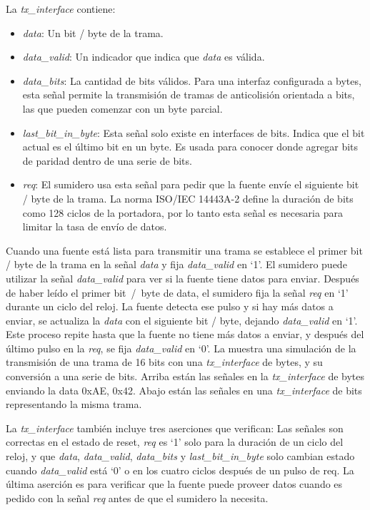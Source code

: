 \documentclass[a4paper, twoside, 11pt]{report}
\begin{document}
\FloatBarrier

La \textit{tx\_interface} contiene:

\begin{itemize}
  \item \textit{data}: Un bit / byte de la trama.
  \item \textit{data\_valid}: Un indicador que indica que \textit{data} es válida.
  \item \textit{data\_bits}: La cantidad de bits válidos. Para una interfaz configurada a bytes, esta señal permite la transmisión de tramas de anticolisión orientada a bits, las que pueden comenzar con un byte parcial.
  \item \textit{last\_bit\_in\_byte}: Esta señal solo existe en interfaces de bits. Indica que el bit actual es el último bit en un byte. Es usada para conocer donde agregar bits de paridad dentro de una serie de bits.
  \item \textit{req}: El sumidero usa esta señal para pedir que la fuente envíe el siguiente bit / byte de la trama. La norma ISO/IEC 14443A-2 define la duración de bits como 128 ciclos de la portadora, por lo tanto esta señal es necesaria para limitar la tasa de envío de datos.
\end{itemize}

Cuando una fuente está lista para transmitir una trama se establece el primer bit / byte de la trama en la señal \textit{data} y fija \textit{data\_valid} en ‘1’. El sumidero puede utilizar la señal \textit{data\_valid} para ver si la fuente tiene datos para enviar. Después de haber leído el primer bit~/~byte de data, el sumidero fija la señal \textit{req} en ‘1’ durante un ciclo del reloj. La fuente detecta ese pulso y si hay más datos a enviar, se actualiza la \textit{data} con el siguiente bit / byte, dejando \textit{data\_valid} en ‘1’. Este proceso repite hasta que la fuente no tiene más datos a enviar, y después del último pulso en la \textit{req}, se fija \textit{data\_valid} en ‘0’. La  muestra una simulación de la transmisión de una trama de 16 bits con una \textit{tx\_interface} de bytes, y su conversión a una serie de bits. Arriba están las señales en la \textit{tx\_interface} de bytes enviando la data 0xAE, 0x42. Abajo están las señales en una \textit{tx\_interface} de bits representando la misma trama.

La \textit{tx\_interface} también incluye tres aserciones que verifican: Las señales son correctas en el estado de reset, \textit{req} es ‘1’ solo para la duración de un ciclo del reloj, y que \textit{data}, \textit{data\_valid}, \textit{data\_bits} y \textit{last\_bit\_in\_byte} solo cambian estado cuando \textit{data\_valid} está ‘0’ o en los cuatro ciclos después de un pulso de req. La última aserción es para verificar que la fuente puede proveer datos cuando es pedido con la señal \textit{req} antes de que el sumidero la necesita.
\end{document}
